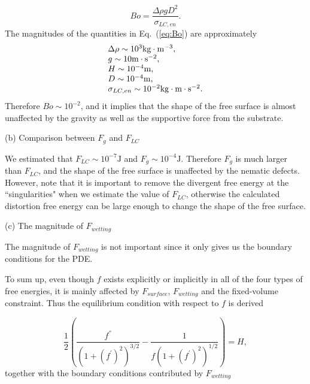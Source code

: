 \documentclass[nottitlepage]{article}
\begin{document}
\begin{equation}\label{eq:Bo}
Bo=\frac{\Delta\rho g D^2}{\sigma_{LC,en}}.
\end{equation}
The magnitudes of the quantities in Eq.~(\ref{eq:Bo}) are approximately
\begin{equation*}%
       \begin{array}{l l l l l}
       \Delta\rho\sim 10^3 \mathrm{kg}\cdot\mathrm{m}^{-3},\\
       g\sim 10\mathrm{m}\cdot\mathrm{s}^{-2},\\
       H\sim 10^{-4}\mathrm{m},\\
       D\sim 10^{-4}\mathrm{m},\\
       \sigma_{LC,en}\sim 10^{-2}\mathrm{kg}\cdot\mathrm{m}\cdot\mathrm{s}^{-2}.
       \end{array}
       \end{equation*}
Therefore $Bo\sim 10^{-2}$, and it implies that %
the shape of the free surface is almost unaffected by the gravity as well as the supportive force from the substrate.

(b) Comparison between $F_{g}$ and $F_{LC}$

We estimated that $F_{LC}\sim
10^{-7}\mathrm{J}$ and $F_{g}\sim
10^{-4}\mathrm{J}$. Therefore $F_{g}$ is much larger than $F_{LC}$, and the shape of the free surface is unaffected by the nematic defects.
However, note that it is important to remove the divergent free energy at the ``singularities" when we estimate the value of $F_{LC}$, otherwise the calculated distortion free energy can be large enough to change the shape of the free surface.

(c) The magnitude of $F_{wetting}$

The magnitude of $F_{wetting}$ is not important since it only gives us the boundary conditions for the PDE. 

To sum up, even though $f$ exists explicitly or implicitly in all of the four types of free energies, it is mainly affected by $F_{surface}$, $F_{wetting}$ and the fixed-volume constraint. Thus the equilibrium condition with respect to $f$ is derived \cite{vogel}

\begin{equation}\label{eq:f2}
\frac{1}{2}(\frac{f^{''}}{(1+(f^{'})^2)^{3/2}}-\frac{1}{f(1+(f^{'})^2)^{1/2}})=H,
\end{equation}
together with the boundary conditions contributed by $F_{wetting}$
\end{document}
